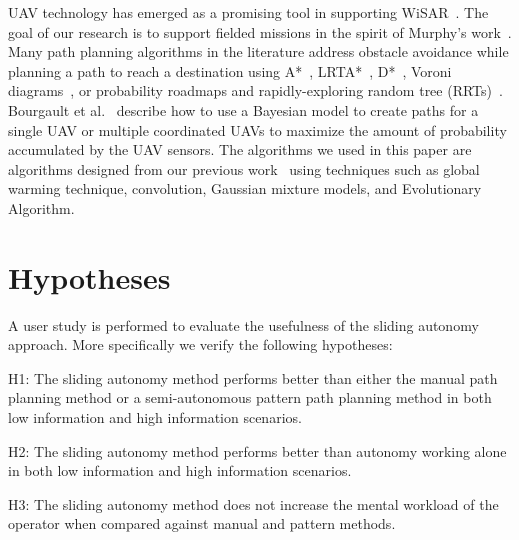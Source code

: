 UAV technology has emerged as a promising tool in supporting WiSAR~\cite{Murphy2008Cooperative,Bourgault2003Coordinated}. The goal of our research is to support fielded missions in the spirit of Murphy's work~\cite{Casper2003Human}. Many path planning algorithms in the literature address obstacle avoidance while planning a path to reach a destination using A*~\cite{Quigley2005Towards}, LRTA*~\cite{Howlett2006Learning}, D*~\cite{Stentz1997Optimal}, Voroni diagrams~\cite{Bortoff2000Path,Beard2005Autonomous}, or probability roadmaps and rapidly-exploring random tree (RRTs)~\cite{Pettersson2006Probabilistic}. 
Bourgault et al.\ \cite{Bourgault2004Coordinated,Bourgault2006Optimal} describe how to use a Bayesian model to create paths for a single UAV or multiple coordinated UAVs to maximize the amount of probability accumulated by the UAV sensors. The algorithms we used in this paper are algorithms designed from our previous work~\cite{Lin2009UAV,Lin2014Hierarchical} using techniques such as global warming technique, convolution, Gaussian mixture models, and Evolutionary Algorithm.

\section{Hypotheses} 
\label{sec:Hypotheses}

A user study is performed to evaluate the usefulness of the sliding autonomy approach. More specifically we verify the following hypotheses:

H1: The sliding autonomy method performs better than either the manual path planning method or a semi-autonomous pattern path planning method in both low information and high information scenarios.

H2: The sliding autonomy method performs better than autonomy working alone in both low information and high information scenarios.

H3: The sliding autonomy method does not increase the mental workload of the operator when compared against manual and pattern methods.

